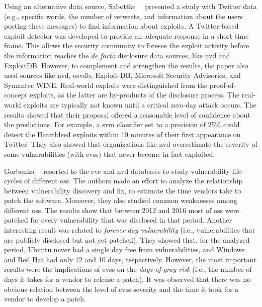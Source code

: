 Using an alternative data source, Sabottke~\etal{}~\cite{Sabottke:2015} presented a study with Twitter data (e.g., specific words, the number of retweets, and information about the users posting these messages) to find information about exploits. 
A Twitter-based exploit detector was developed to provide an adequate response in a short time frame. 
This allows the security community to foresee the exploit activity before the information reaches the \emph{de facto} disclosure data sources, like \gls{nvd} and ExploitDB.
However, to complement and strengthen the results, the paper also used sources like \gls{nvd}, \gls{osvdb}, Exploit-DB, Microsoft Security Advisories, and Symantec WINE. 
Real-world exploits were distinguished from the proof-of-concept exploits, as the latter are by-products of the disclosure process. 
The real-world exploits are typically not known until a critical zero-day attack occurs. 
The results showed that their proposal offered a reasonable level of confidence about the predictions. 
For example, a \gls{svm} classifier set to a precision of 25\% could detect the Heartbleed exploits within 10 minutes of their first appearance on Twitter. 
They also showed that organizations like \gls{nvd} overestimate the severity of some vulnerabilities (with \gls{cvss}) that never become in fact exploited.


Gorbenko~\etal{}~\cite{Gorbenko:2017} resorted to the \gls{cve} and \gls{nvd} databases to study vulnerability life-cycles of different \glspl{os}.
The authors made an effort to analyze the relationship between vulnerability discovery and fix, to estimate the time vendors take to patch the software.
Moreover, they also studied common weaknesses among different \glspl{os}.
The results show that between 2012 and 2016 most of \glspl{os} were patched for every vulnerability that was disclosed in that period.
Another interesting result was related to \emph{forever-day vulnerability} (i.e., vulnerabilities that are publicly disclosed but not yet patched). 
They showed that, for the analyzed period, Ubuntu never had a single day free from vulnerabilities, and Windows and Red Hat had only 12 and 10 days, respectively.
However, the most important results were the implications of \gls{cvss} on the \emph{days-of-gray-risk} (i.e., the number of days it takes for a vendor to release a patch). 
It was observed that there was no obvious relation between the level of \gls{cvss} severity and the time it took for a vendor to develop a patch.


